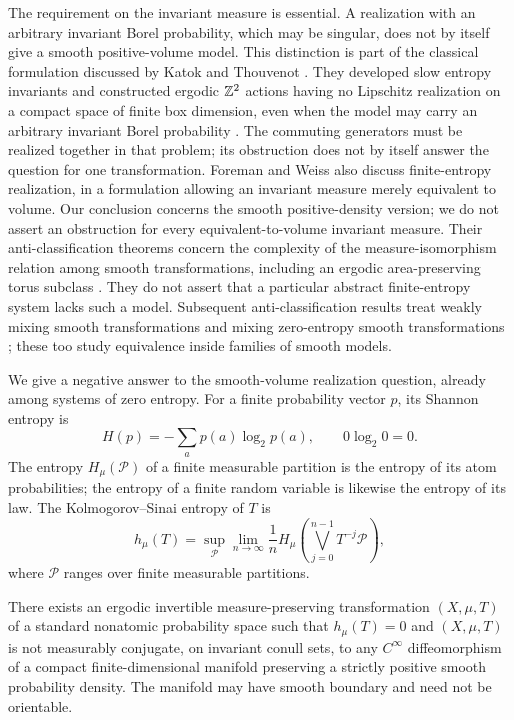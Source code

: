 The requirement on the invariant measure is essential. A realization
with an arbitrary invariant Borel probability, which may be singular,
does not by itself give a smooth positive-volume model. This distinction is part of the
classical formulation discussed by Katok and Thouvenot
\cite[pp.~324--326]{KatokThouvenot1997}. They developed slow entropy
invariants and constructed ergodic $\mathbb Z^2$ actions having no Lipschitz
realization on a compact space of finite box dimension, even when the
model may carry an arbitrary invariant Borel probability
\cite[Proposition~4 and Corollary~2]{KatokThouvenot1997}.
The commuting generators must be realized together in that problem;
its obstruction does not by itself answer the question for one
transformation. Foreman and Weiss
\cite[p.~2607]{ForemanWeiss2022} also discuss finite-entropy realization,
in a formulation allowing an invariant measure merely equivalent to
volume. Our conclusion concerns the smooth positive-density version;
we do not assert an obstruction for every equivalent-to-volume
invariant measure. Their anti-classification theorems concern the complexity of the
measure-isomorphism relation among smooth transformations, including
an ergodic area-preserving torus subclass
\cite[Theorems~1--2 and Corollary~4]{ForemanWeiss2022}.
They do not assert that a particular abstract finite-entropy system
lacks such a model. Subsequent anti-classification results treat
weakly mixing smooth transformations \cite[Theorem~B]{Kunde2024} and mixing
zero-entropy smooth transformations \cite[Theorem~2]{GerberKunde2025Mixing};
these too study equivalence inside families of smooth models.

We give a negative answer to the smooth-volume realization question,
already among systems of zero entropy.
For a finite probability vector $p$, its Shannon entropy is
\[
 H(p)=-\sum_a p(a)\log_2 p(a),\qquad 0\log_2 0=0.
\]
The entropy $H_\mu(\mathcal P)$ of a finite measurable partition is
the entropy of its atom probabilities; the entropy of a finite random
variable is likewise the entropy of its law.
The Kolmogorov--Sinai entropy of $T$ is
\[
 h_\mu(T)=\sup_{\mathcal P}\lim_{n\to\infty}
 \frac1n H_\mu\!\left(\bigvee_{j=0}^{n-1}T^{-j}\mathcal P\right),
\]
where $\mathcal P$ ranges over finite measurable partitions.

\begin{theorem}\label{thm:main}
There exists an ergodic invertible measure-preserving transformation
$(X,\mu,T)$ of a standard nonatomic probability space such that
$h_\mu(T)=0$ and $(X,\mu,T)$ is not measurably conjugate, on invariant conull sets, to
any $C^\infty$ diffeomorphism of a compact finite-dimensional manifold
preserving a strictly positive smooth probability density. The manifold
may have smooth boundary and need not be orientable.
\end{theorem}

